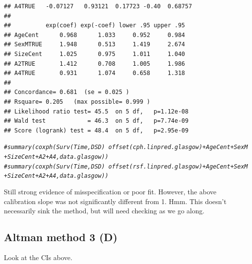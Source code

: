 \documentclass{article}\usepackage[]{graphicx}\usepackage[]{color}
\makeatletter
\newcommand{\hlcom}[1]{\textcolor[rgb]{0.678,0.584,0.686}{\textit{#1}}}%
\newenvironment{kframe}{%
 \def\at@end@of@kframe{}%
 \ifinner\ifhmode%
  \def\at@end@of@kframe{\end{minipage}}%
  \begin{minipage}{\columnwidth}%
 \fi\fi%
 \def\FrameCommand##1{\hskip\@totalleftmargin \hskip-\fboxsep
 \colorbox{shadecolor}{##1}\hskip-\fboxsep
     \hskip-\linewidth \hskip-\@totalleftmargin \hskip\columnwidth}%
 \MakeFramed {\advance\hsize-\width
   \@totalleftmargin\z@ \linewidth\hsize
   \@setminipage}}%
 {\par\unskip\endMakeFramed%
 \at@end@of@kframe}
\newenvironment{knitrout}{}{} %
\makeatother
\begin{document}
\begin{knitrout}
\begin{kframe}
\begin{verbatim}
## A4TRUE   -0.07127   0.93121  0.17723 -0.40  0.68757
## 
##          exp(coef) exp(-coef) lower .95 upper .95
## AgeCent      0.968      1.033     0.952     0.984
## SexMTRUE     1.948      0.513     1.419     2.674
## SizeCent     1.025      0.975     1.011     1.040
## A2TRUE       1.412      0.708     1.005     1.986
## A4TRUE       0.931      1.074     0.658     1.318
## 
## Concordance= 0.681  (se = 0.025 )
## Rsquare= 0.205   (max possible= 0.999 )
## Likelihood ratio test= 45.5  on 5 df,   p=1.12e-08
## Wald test            = 46.3  on 5 df,   p=7.74e-09
## Score (logrank) test = 48.4  on 5 df,   p=2.95e-09
\end{verbatim}
\begin{alltt}
\hlcom{# summary(coxph(Surv(Time, DSD) ~ offset(cph.linpred.glasgow) + AgeCent + SexM + SizeCent + A2 + A4, data.glasgow))}
\hlcom{# summary(coxph(Surv(Time, DSD) ~ offset(rsf.linpred.glasgow) + AgeCent + SexM + SizeCent + A2 + A4, data.glasgow))}
\end{alltt}
\end{kframe}
\end{knitrout}
Still strong evidence of misspecification or poor fit.  However, the above calibration slope was not significantly different from 1.  Hmm.  This doesn't necessarily sink the method, but will need checking as we go along.

\subsection{Altman method 3 (D)}
Look at the CIs above.
\end{document}
